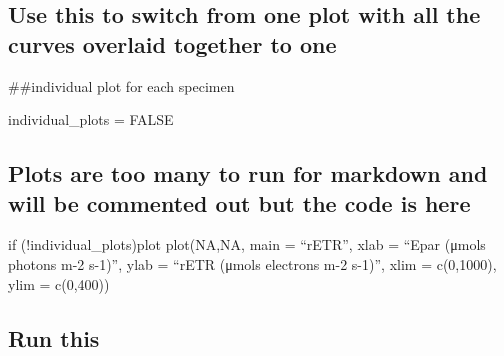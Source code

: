 \documentclass[
]{article}
\newenvironment{Shaded}{\begin{snugshade}}{\end{snugshade}}
\newcommand{\ConstantTok}[1]{\textcolor[rgb]{0.00,0.00,0.00}{#1}}
\newcommand{\NormalTok}[1]{#1}
\newcommand{\OtherTok}[1]{\textcolor[rgb]{0.56,0.35,0.01}{#1}}
\begin{document}
\hypertarget{use-this-to-switch-from-one-plot-with-all-the-curves-overlaid-together-to-one}{%
\subsection{Use this to switch from one plot with all the curves
overlaid together to
one}\label{use-this-to-switch-from-one-plot-with-all-the-curves-overlaid-together-to-one}}

\#\#individual plot for each specimen

\begin{Shaded}
\begin{Highlighting}[]
\NormalTok{individual\_plots }\OtherTok{=} \ConstantTok{FALSE}
\end{Highlighting}
\end{Shaded}

\hypertarget{plots-are-too-many-to-run-for-markdown-and-will-be-commented-out-but-the-code-is-here}{%
\subsection{Plots are too many to run for markdown and will be commented
out but the code is
here}\label{plots-are-too-many-to-run-for-markdown-and-will-be-commented-out-but-the-code-is-here}}

if (!individual\_plots)plot plot(NA,NA, main = ``rETR'', xlab = ``Epar
(μmols photons m-2 s-1)'', ylab = ``rETR (μmols electrons m-2 s-1)'',
xlim = c(0,1000), ylim = c(0,400))

\hypertarget{run-this}{%
\subsection{Run this}\label{run-this}}
\end{document}
